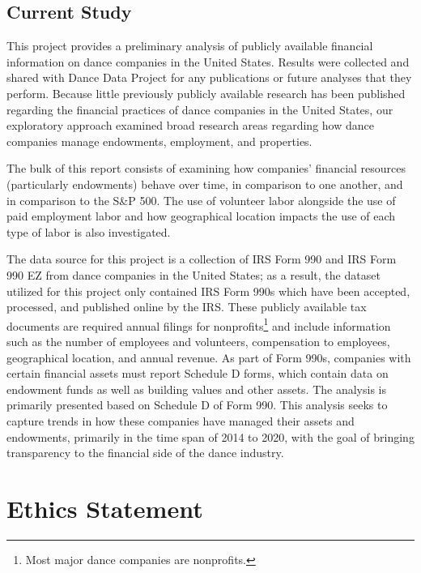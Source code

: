 \documentclass[Dance Data
Project,article,submit,moreauthors,pdftex]{mdpi}
\begin{document}
\hypertarget{current-study}{%
\subsection{Current Study}\label{current-study}}

This project provides a preliminary analysis of publicly available
financial information on dance companies in the United States. Results
were collected and shared with Dance Data Project for any publications
or future analyses that they perform. Because little previously publicly
available research has been published regarding the financial practices
of dance companies in the United States, our exploratory approach
examined broad research areas regarding how dance companies manage
endowments, employment, and properties.

The bulk of this report consists of examining how companies' financial
resources (particularly endowments) behave over time, in comparison to
one another, and in comparison to the S\&P 500. The use of volunteer
labor alongside the use of paid employment labor and how geographical
location impacts the use of each type of labor is also investigated.

The data source for this project is a collection of IRS Form 990 and IRS
Form 990 EZ from dance companies in the United States; as a result, the
dataset utilized for this project only contained IRS Form 990s which
have been accepted, processed, and published online by the IRS. These
publicly available tax documents are required annual filings for
nonprofits\footnote{Most major dance companies are nonprofits.} and
include information such as the number of employees and volunteers,
compensation to employees, geographical location, and annual revenue. As
part of Form 990s, companies with certain financial assets must report
Schedule D forms, which contain data on endowment funds as well as
building values and other assets. The analysis is primarily presented
based on Schedule D of Form 990. This analysis seeks to capture trends
in how these companies have managed their assets and endowments,
primarily in the time span of 2014 to 2020, with the goal of bringing
transparency to the financial side of the dance industry.

\hypertarget{ethics-statement}{%
\section{Ethics Statement}\label{ethics-statement}}
\end{document}
